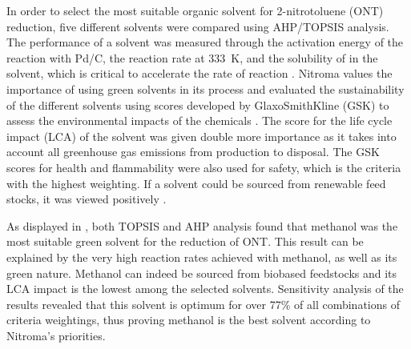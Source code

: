 In order to select the most suitable organic solvent for 2-nitrotoluene (ONT) reduction, five different solvents were compared using AHP/TOPSIS analysis. The performance of a solvent was measured through the activation energy of the reaction with Pd/C, the reaction rate at \SI{333}{\K}, and the solubility of  in the solvent, which is critical to accelerate the rate of reaction \cite{rajadhyaksha_solvent_1986}. Nitroma values the importance of using green solvents in its process and evaluated the sustainability of the different solvents using scores developed by GlaxoSmithKline (GSK) to assess the environmental impacts of the chemicals \cite{henderson_expanding_2011}. The score for the life cycle impact (LCA) of the solvent was given double more importance as it takes into account all greenhouse gas emissions from production to disposal. The GSK scores for health and flammability were also used for safety, which is the criteria with the highest weighting. If a solvent could be sourced from renewable feed stocks, it was viewed positively \cite{byrne_tools_2016}. %

As displayed in , both TOPSIS and AHP analysis found that methanol was the most suitable green solvent for the reduction of ONT. This result can be explained by the very high reaction rates achieved with methanol, as well as its green nature. Methanol can indeed be sourced from biobased feedstocks and its LCA impact is the lowest among the selected solvents. Sensitivity analysis of the results revealed that this solvent is optimum for over 77\% of all combinations of criteria weightings, thus proving methanol is the best solvent according to Nitroma's priorities. 



